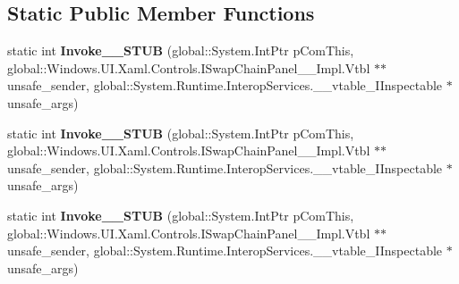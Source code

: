 \subsection*{Static Public Member Functions}
\begin{DoxyCompactItemize}
\item 
\mbox{\label{struct_windows_1_1_foundation_1_1_typed_event_handler___a___windows___u_i___xaml___controls___swe8a58bc0b25f8af5f9c8249e14c85158_ad47784f667f77dada4c4ee9af6a45723}} 
static int {\bfseries Invoke\+\_\+\+\_\+\+S\+T\+UB} (global\+::\+System.\+Int\+Ptr p\+Com\+This, global\+::\+Windows.\+U\+I.\+Xaml.\+Controls.\+I\+Swap\+Chain\+Panel\+\_\+\+\_\+\+Impl.\+Vtbl $\ast$$\ast$unsafe\+\_\+sender, global\+::\+System.\+Runtime.\+Interop\+Services.\+\_\+\+\_\+vtable\+\_\+\+I\+Inspectable $\ast$unsafe\+\_\+args)
\item 
\mbox{\label{struct_windows_1_1_foundation_1_1_typed_event_handler___a___windows___u_i___xaml___controls___swe8a58bc0b25f8af5f9c8249e14c85158_ad47784f667f77dada4c4ee9af6a45723}} 
static int {\bfseries Invoke\+\_\+\+\_\+\+S\+T\+UB} (global\+::\+System.\+Int\+Ptr p\+Com\+This, global\+::\+Windows.\+U\+I.\+Xaml.\+Controls.\+I\+Swap\+Chain\+Panel\+\_\+\+\_\+\+Impl.\+Vtbl $\ast$$\ast$unsafe\+\_\+sender, global\+::\+System.\+Runtime.\+Interop\+Services.\+\_\+\+\_\+vtable\+\_\+\+I\+Inspectable $\ast$unsafe\+\_\+args)
\item 
\mbox{\label{struct_windows_1_1_foundation_1_1_typed_event_handler___a___windows___u_i___xaml___controls___swe8a58bc0b25f8af5f9c8249e14c85158_ad47784f667f77dada4c4ee9af6a45723}} 
static int {\bfseries Invoke\+\_\+\+\_\+\+S\+T\+UB} (global\+::\+System.\+Int\+Ptr p\+Com\+This, global\+::\+Windows.\+U\+I.\+Xaml.\+Controls.\+I\+Swap\+Chain\+Panel\+\_\+\+\_\+\+Impl.\+Vtbl $\ast$$\ast$unsafe\+\_\+sender, global\+::\+System.\+Runtime.\+Interop\+Services.\+\_\+\+\_\+vtable\+\_\+\+I\+Inspectable $\ast$unsafe\+\_\+args)
\item 
\mbox{\label{struct_windows_1_1_foundation_1_1_typed_event_handler___a___windows___u_i___xaml___controls___swe8a58bc0b25f8af5f9c8249e14c85158_ad47784f667f77dada4c4ee9af6a45723}} 
$$
\end{DoxyCompactItemize}
